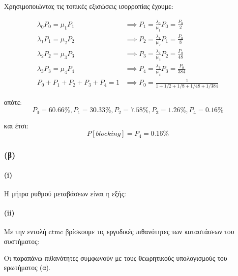 \documentclass[a4paper]{article}
\begin{document}
Χρησιμοποιώντας τις τοπικές εξισώσεις ισορροπίας έχουμε: 

\begin{align*}
	λ_0P_0=μ_1P_1 &\implies P_1 = \frac{λ_0}{μ_1}P_0 = \frac{P_0}{2} \\
	λ_1P_1=μ_2P_2 &\implies P_2 = \frac{λ_1}{μ_2}P_1 = \frac{P_0}{8} \\
	λ_2P_2=μ_3P_3 &\implies P_3 = \frac{λ_2}{μ_3}P_2 = \frac{P_0}{48} \\
	λ_3P_3=μ_4P_4 &\implies P_4 = \frac{λ_3}{μ_4}P_3 = \frac{P_0}{384} \\
	P_0+P_1+P_2+P_3+P_4=1 &\implies P_0 = \frac{1}{1+1/2+1/8+1/48+1/384}
\end{align*}

οπότε:
\[
	P_0 = 60.66\%, P_1 = 30.33\%, P_2 = 7.58\%, P_3 = 1.26\%, P_4 = 0.16\%
\]

και έτσι: 
\[
	P[blocking] = P_4 = 0.16\%
\]

\subsubsection*{(β)}

\paragraph{(i)}

Η μήτρα ρυθμού μεταβάσεων είναι η εξής:

\begin{minipage}{\textwidth}

\end{minipage}

\paragraph{(ii)}

Με την εντολή ctmc βρίσκουμε τις εργοδικές πιθανότητες των καταστάσεων του συστήματος:



Οι παραπάνω πιθανότητες συμφωνούν με τους θεωρητικούς υπολογισμούς του ερωτήματος (α).
\end{document}
